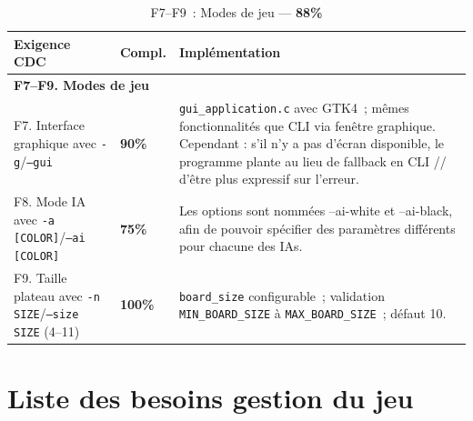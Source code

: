 \documentclass[a4paper]{article}
\begin{document}
 
\begin{table}[H]
\centering
\renewcommand{\arraystretch}{1.4}
\begin{tabular}{|p{6cm}|p{1.5cm}|p{8cm}|}
\hline
\textbf{Exigence CDC} & \textbf{Compl.} & \textbf{Implémentation} \\
\hline
\multicolumn{3}{|l|}{\textbf{F7--F9. Modes de jeu}} \\
\hline
F7. Interface graphique avec \texttt{-g}/\texttt{--gui}
& \textbf{90\%}
& \texttt{gui\_application.c} avec GTK4~; mêmes fonctionnalités que CLI via fenêtre graphique. Cependant : s'il n'y a pas d'écran disponible, le programme plante au lieu de fallback en CLI // d'être plus expressif sur l'erreur. \\
\hline
F8. Mode IA avec \texttt{-a [COLOR]}/\texttt{--ai [COLOR]}
& \textbf{75\%}
& Les options sont nommées --ai-white et --ai-black, afin de pouvoir spécifier des paramètres différents pour chacune des IAs.  \\
\hline
F9. Taille plateau avec \texttt{-n SIZE}/\texttt{--size SIZE} (4--11)
& \textbf{100\%}
& \texttt{board\_size} configurable~; validation \texttt{MIN\_BOARD\_SIZE} à \texttt{MAX\_BOARD\_SIZE}~; défaut 10. \\
\hline
\end{tabular}
\caption{F7--F9~: Modes de jeu --- \textbf{88\%}}
\label{tab:f7-f9}
\end{table}
 
 
\section{Liste des besoins gestion du jeu}
\label{ann:besoins-gestion}
 
 
\end{document}
